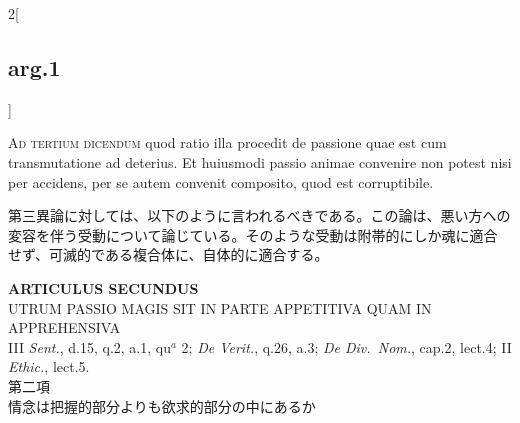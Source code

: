 \documentclass[paper=a4paper,fontsize=10pt,jafontsize=9pt,titlepage]{jlreq}
\begin{document}
\begin{paracol}{2}[\subsection{arg.1}]
\switchcolumn*[\subsection{ad.3}]

{\scshape Ad tertium dicendum} quod ratio illa procedit de passione quae est cum
 transmutatione ad deterius. Et huiusmodi passio animae convenire non
 potest nisi per accidens, per se autem convenit composito, quod est
 corruptibile.

\switchcolumn

第三異論に対しては、以下のように言われるべきである。この論は、悪い方への
 変容を伴う受動について論じている。そのような受動は附帯的にしか魂に適合
 せず、可滅的である複合体に、自体的に適合する。

\end{paracol}
\newpage
{}
{}
\setcounter{section}{2}
\setcounter{subsection}{0}

\begin{center}
 {\Large {\bfseries ARTICULUS SECUNDUS}}\\
 {\large UTRUM PASSIO MAGIS SIT IN PARTE APPETITIVA QUAM IN APPREHENSIVA}\\
 {\footnotesize III {\itshape Sent.}, d.15, q.2, a.1, qu$^a$ 2;
 {\itshape De Verit.}, q.26, a.3; {\itshape De Div.~Nom.}, cap.2,
 lect.4; II {\itshape Ethic.}, lect.5.}\\
 {\Large 第二項\\情念は把握的部分よりも欲求的部分の中にあるか}
\end{center}
\end{document}
